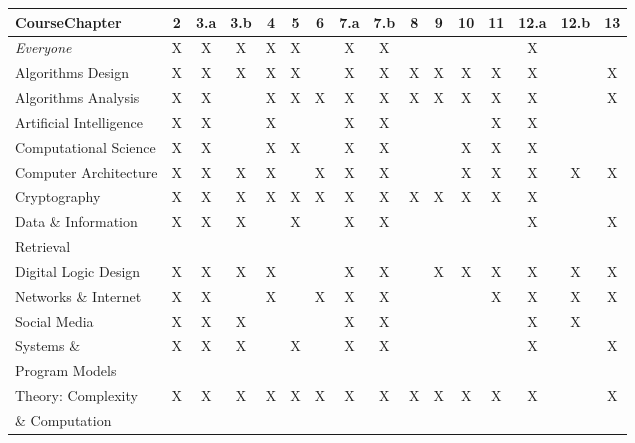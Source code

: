 \documentclass{article}
\begin{document}
\bigskip

{\scriptsize

\noindent
\begin{tabular}{|l||c|c|c|c|c|c|c|c|c|c|c|c|c|c|c|}
\hline
{\bf Course}{\bf Chapter}
   & 2 & 3.a & 3.b & 4 & 5 & 6 & 7.a & 7.b & 8 & 9 & 10 & 11 & 12.a & 12.b & 13 \\
\hline
\hline
{\em Everyone} 
   & X & X & X & X & X &  & X & X &  &  &  &  & X & &  \\
\hline
Algorithms Design
   & X & X & X & X & X &  & X & X & X & X & X & X & X & & X \\
\hline
Algorithms Analysis
   & X & X & & X & X & X & X & X & X & X & X & X & X & & X \\
   \hline
Artificial Intelligence
   & X & X & & X &  &  & X & X &  &  &  & X & X & &  \\
   \hline
Computational Science
   & X & X & & X & X &  & X & X &  &  & X & X & X &  &  \\
\hline
Computer Architecture 
   & X & X & X & X &  & X & X & X &  &  & X & X & X & X & X \\
\hline
Cryptography 
   & X & X & X & X & X & X & X & X & X & X & X & X & X & &  \\
\hline
Data \& Information 
   & X & X & X & & X &  & X & X &  &  &  &  & X & & X \\
Retrieval
    &  &  &  &  &  &  &  &  &  &  & &  &  & & \\
\hline
Digital Logic Design 
   & X & X & X & X &  &  & X & X &  & X & X & X & X & X & X \\
\hline
Networks \& Internet
   & X & X & & X &  & X & X & X &  &  &  & X & X & X & X \\
\hline
Social Media 
   & X & X & X &  &  &  & X & X &  &  &  &  & X & X &  \\
\hline
Systems \&     
  & X & X & X &  & X &  & X & X &  &  &  &  & X & & X \\
Program Models &  & &  &  &  &  & &  &  &  &  &  &  & & \\ 
\hline
Theory: Complexity 
   & X & X & X & X & X & X & X & X & X & X & X & X & X & & X \\
\& Computation    &  &  & &  &  &  & &  &  &  &  &  &  & & \\
\hline
\end{tabular}
}


\bigskip
\end{document}
